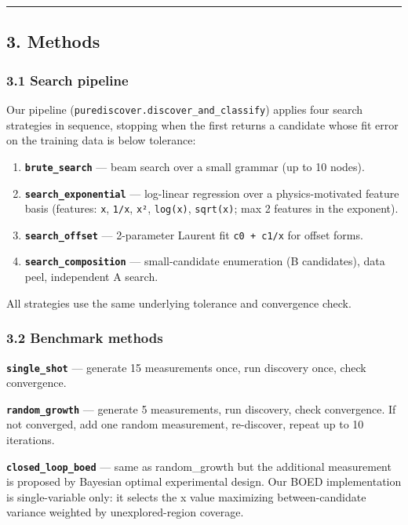\documentclass[
]{article}
\providecommand{\tightlist}{%
  \setlength{\itemsep}{0pt}\setlength{\parskip}{0pt}}
\begin{document}
\begin{center}\rule{0.5\linewidth}{0.5pt}\end{center}

\subsection{3. Methods}\label{methods}

\subsubsection{3.1 Search pipeline}\label{search-pipeline}

Our pipeline (\texttt{purediscover.discover\_and\_classify}) applies
four search strategies in sequence, stopping when the first returns a
candidate whose fit error on the training data is below tolerance:

\begin{enumerate}
\def\labelenumi{\arabic{enumi}.}
\tightlist
\item
  \textbf{\texttt{brute\_search}} --- beam search over a small grammar
  (up to 10 nodes).
\item
  \textbf{\texttt{search\_exponential}} --- log-linear regression over a
  physics-motivated feature basis (features: \texttt{x}, \texttt{1/x},
  \texttt{x²}, \texttt{log(x)}, \texttt{sqrt(x)}; max 2 features in the
  exponent).
\item
  \textbf{\texttt{search\_offset}} --- 2-parameter Laurent fit
  \texttt{c0\ +\ c1/x} for offset forms.
\item
  \textbf{\texttt{search\_composition}} --- small-candidate enumeration
  (B candidates), data peel, independent A search.
\end{enumerate}

All strategies use the same underlying tolerance and convergence check.

\subsubsection{3.2 Benchmark methods}\label{benchmark-methods}

\textbf{\texttt{single\_shot}} --- generate 15 measurements once, run
discovery once, check convergence.

\textbf{\texttt{random\_growth}} --- generate 5 measurements, run
discovery, check convergence. If not converged, add one random
measurement, re-discover, repeat up to 10 iterations.

\textbf{\texttt{closed\_loop\_boed}} --- same as random\_growth but the
additional measurement is proposed by Bayesian optimal experimental
design. Our BOED implementation is single-variable only: it selects the
x value maximizing between-candidate variance weighted by
unexplored-region coverage.
\end{document}
